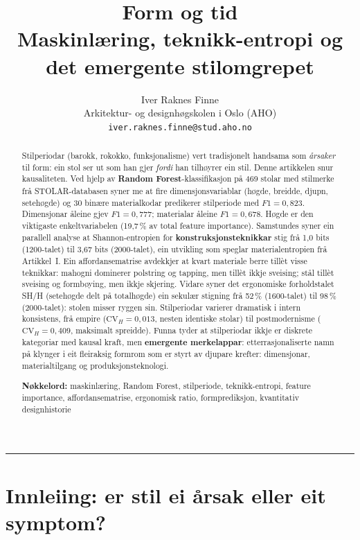 \documentclass[10pt, a4paper, twocolumn]{article}
\title{%
  \textbf{Form og tid}\\[0.4em]
  \large Maskinl\ae ring, teknikk-entropi og det emergente stilomgrepet%
}
\author{%
  Iver Raknes Finne\\
  \small Arkitektur- og designhøgskolen i Oslo (AHO)\\
  \small \texttt{iver.raknes.finne@stud.aho.no}
}
\date{}
\begin{document}
\maketitle

\begin{abstract}
\noindent Stilperiodar (barokk, rokokko, funksjonalisme) vert tradisjonelt handsama som \emph{årsaker} til form: ein stol ser ut som han gjer \emph{fordi} han tilhøyrer ein stil. Denne artikkelen snur kausaliteten. Ved hjelp av \textbf{Random Forest}-klassifikasjon på 469 stolar med stilmerke frå STOLAR-databasen syner me at fire dimensjonsvariablar (høgde, breidde, djupn, setehøgde) og 30 binære materialkodar predikerer stilperiode med $F1 = 0{,}823$. Dimensjonar åleine gjev $F1 = 0{,}777$; materialar åleine $F1 = 0{,}678$. Høgde er den viktigaste enkeltvariabelen (19,7\,\% av total feature importance). Samstundes syner ein parallell analyse at Shannon-entropien for \textbf{konstruksjonsteknikkar} stig frå 1,0 bits (1200-talet) til 3,67 bits (2000-talet), ein utvikling som speglar materialentropien frå Artikkel~I. Ein affordansematrise avdekkjer at kvart materiale berre tillèt visse teknikkar: mahogni dominerer polstring og tapping, men tillèt ikkje sveising; stål tillèt sveising og formbøying, men ikkje skjering. Vidare syner det ergonomiske forholdstalet SH/H (setehøgde delt på totalhøgde) ein sekulær stigning frå 52\,\% (1600-talet) til 98\,\% (2000-talet): stolen misser ryggen sin. Stilperiodar varierer dramatisk i intern konsistens, frå empire ($\text{CV}_H = 0{,}013$, nesten identiske stolar) til postmodernisme ($\text{CV}_H = 0{,}409$, maksimalt spreidde). Funna tyder at stilperiodar ikkje er diskrete kategoriar med kausal kraft, men \textbf{emergente merkelappar}: etterrasjonaliserte namn på klynger i eit fleiraksig formrom som er styrt av djupare krefter: dimensjonar, materialtilgang og produksjonsteknologi.

\medskip
\noindent\textbf{Nøkkelord:} maskinlæring, Random Forest, stilperiode, teknikk-entropi, feature importance, affordansematrise, ergonomisk ratio, formprediksjon, kvantitativ designhistorie
\end{abstract}

\vspace{1em}
\hrule
\vspace{1.5em}


\section{Innleiing: er stil ei årsak eller eit symptom?}
\end{document}
